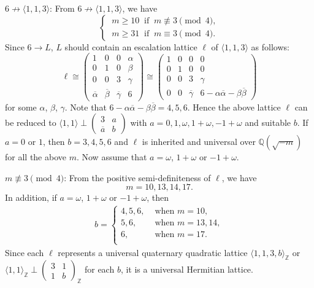 \documentclass[a4paper,10pt,reqno]{amsart}
\begin{document}
{} $6 \not\to {\langle {1,1,3} \rangle}$: From $6 \not\to {\langle {1,1,3} \rangle}$,
we have
\[
    \begin{cases}
        ~m \ge 10 ~\text{ if } ~m {\not\equiv} 3 \pmod{4},\\
        ~m \ge 31 ~\text{ if } ~m \equiv  3 \pmod{4}.
    \end{cases}
\]
Since $6 \to L$, $L$ should contain an escalation lattice $\ell$
of ${\langle {1,1,3} \rangle}$ as follows:
\[  \ell \cong
    \begin{pmatrix}
        1 & 0 & 0 & \alpha \\
        0 & 1 & 0 & \beta \\
        0 & 0 & 3 & \gamma \\
        {\overline{{\alpha}}} & {\overline{{\beta}}} & {\overline{{\gamma}}} & 6
    \end{pmatrix}
    \cong
    \begin{pmatrix}
        1 & 0 & 0 & 0 \\
        0 & 1 & 0 & 0 \\
        0 & 0 & 3 & \gamma \\
        0 & 0 & {\overline{{\gamma}}} & 6-\alpha{\overline{{\alpha}}}-\beta{\overline{{\beta}}}
    \end{pmatrix}
\]
for some $\alpha$, $\beta$, $\gamma$. Note that $6 - \alpha
{\overline{{\alpha}}} - \beta {\overline{{\beta}}} = 4, 5, 6$. Hence the above
lattice $\ell$ can be reduced to ${\langle {1,1} \rangle} \perp
{\begin{pmatrix}
  3 & a \\
  {{\overline{{a}}}} & b
\end{pmatrix}}$ with $a = 0, 1, \omega, 1+\omega,
-1+\omega$ and suitable $b$. If $a=0$ or $1$, then $b = 3, 4, 5, 6$
and $\ell$ is inherited and universal over ${\mathbb{Q}(\sqrt{{-m}})}$ for all the
above $m$. Now assume that $a= \omega$, $1+\omega$ or $-1+\omega$.

{} $m {\not\equiv} 3 \pmod{4}$: From the positive semi-definiteness of $\ell$, we have
\[
    m = 10, 13, 14, 17.
\]
In addition, if $a= \omega$, $1+\omega$ or $-1+\omega$, then
\begin{align*}
     b = \begin{cases}
         4, 5, 6,  &\text{ when } m = 10,\\
         5, 6,     &\text{ when } m = 13, 14,\\
         6,        &\text{ when } m = 17.\\
         \end{cases}
\end{align*}
Since each $\ell$ represents a universal quaternary quadratic lattice ${\langle {1,1,3,b} \rangle}_{\mathbb{Z}}$ or
${\langle {1,1} \rangle}_{\mathbb{Z}}\perp{\begin{pmatrix}
  3 & 1 \\
  1 & b
\end{pmatrix}}_{\mathbb{Z}}$ for each $b$, it is a universal Hermitian lattice.
\end{document}
